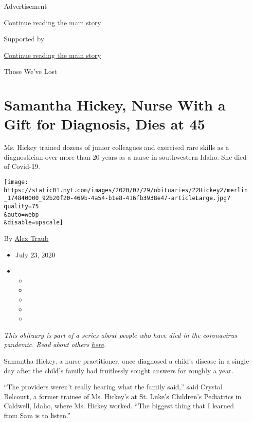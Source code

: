 Advertisement

\protect\hyperlink{after-top}{Continue reading the main story}

Supported by

\protect\hyperlink{after-sponsor}{Continue reading the main story}

Those We've Lost

\hypertarget{samantha-hickey-nurse-with-a-gift-for-diagnosis-dies-at-45}{%
\section{Samantha Hickey, Nurse With a Gift for Diagnosis, Dies at
45}\label{samantha-hickey-nurse-with-a-gift-for-diagnosis-dies-at-45}}

Ms. Hickey trained dozens of junior colleagues and exercised rare skills
as a diagnostician over more than 20 years as a nurse in southwestern
Idaho. She died of Covid-19.

\texttt{[image: https://static01.nyt.com/images/2020/07/29/obituaries/22Hickey2/merlin\_174840000\_92b20f20-469b-4a54-b1e8-416fb3938e47-articleLarge.jpg?quality=75\\\&auto=webp\\\&disable=upscale]}

By \href{https://www.nytimes.com/by/alex-traub}{Alex Traub}

\begin{itemize}
\item
  July 23, 2020
\item
  \begin{itemize}
  \item
  \item
  \item
  \item
  \item
  \end{itemize}
\end{itemize}

\emph{This obituary is part of a series about people who have died in
the coronavirus pandemic. Read about others}
\href{https://www.nytimes.com/interactive/2020/obituaries/people-died-coronavirus-obituaries.html}{\emph{here}}\emph{.}

Samantha Hickey, a nurse practitioner, once diagnosed a child's disease
in a single day after the child's family had fruitlessly sought answers
for roughly a year.

``The providers weren't really hearing what the family said,'' said
Crystal Belcourt, a former trainee of Ms. Hickey's at St. Luke's
Children's Pediatrics in Caldwell, Idaho, where Ms. Hickey worked. ``The
biggest thing that I learned from Sam is to listen.''


